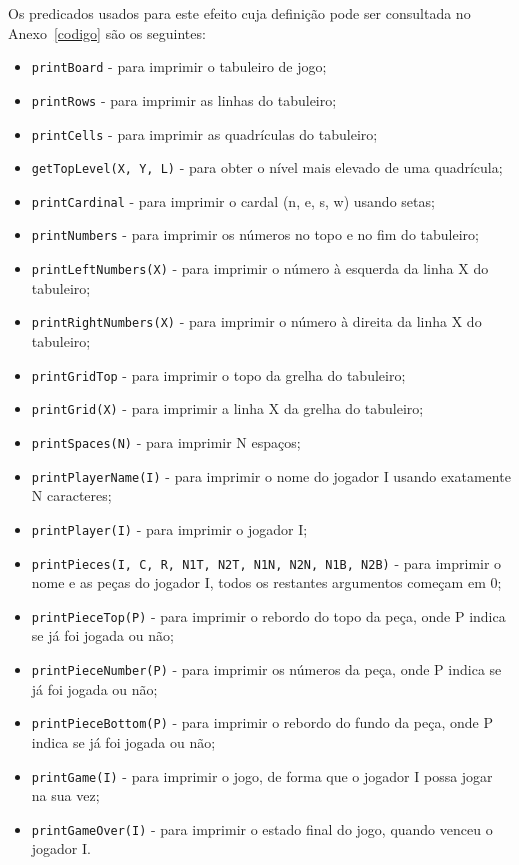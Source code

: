 \documentclass[a4paper]{article}
\begin{document}
Os predicados usados para este efeito cuja definição pode ser consultada no Anexo~\ref{codigo} são os seguintes:
\begin{itemize}
	\item \verb|printBoard| - para imprimir o tabuleiro de jogo;
	\item \verb|printRows| - para imprimir as linhas do tabuleiro;
	\item \verb|printCells| - para imprimir as quadrículas do tabuleiro;
	\item \verb|getTopLevel(X, Y, L)| - para obter o nível mais elevado de uma quadrícula;
	\item \verb|printCardinal| - para imprimir o cardal (n, e, s, w) usando setas;
	\item \verb|printNumbers| - para imprimir os números no topo e no fim do tabuleiro;
	\item \verb|printLeftNumbers(X)| - para imprimir o número à esquerda da linha X do tabuleiro;
	\item \verb|printRightNumbers(X)| - para imprimir o número à direita da linha X do tabuleiro;
	\item \verb|printGridTop| - para imprimir o topo da grelha do tabuleiro;
	\item \verb|printGrid(X)| - para imprimir a linha X da grelha do tabuleiro;
	\item \verb|printSpaces(N)| - para imprimir N espaços;
	\item \verb|printPlayerName(I)| - para imprimir o nome do jogador I usando exatamente N caracteres;
	\item \verb|printPlayer(I)| - para imprimir o jogador I;
	\item \verb|printPieces(I, C, R, N1T, N2T, N1N, N2N, N1B, N2B)| - para imprimir o nome e as peças do jogador I, todos os restantes argumentos começam em 0;
	\item \verb|printPieceTop(P)| - para imprimir o rebordo do topo da peça, onde P indica se já foi jogada ou não;
	\item \verb|printPieceNumber(P)| - para imprimir os números da peça, onde P indica se já foi jogada ou não;
	\item \verb|printPieceBottom(P)| - para imprimir o rebordo do fundo da peça, onde P indica se já foi jogada ou não;
	\item \verb|printGame(I)| - para imprimir o jogo, de forma que o jogador I possa jogar na sua vez;
	\item \verb|printGameOver(I)| - para imprimir o estado final do jogo, quando venceu o jogador I.
\end{itemize}
\end{document}
